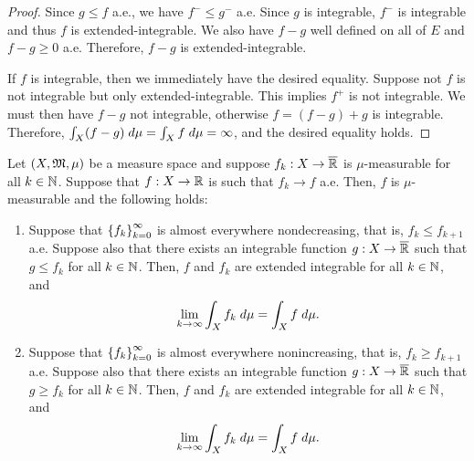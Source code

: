 \documentclass[a4paper]{article}
\begin{document}
\begin{proof}
Since $g \leq f$ a.e., we have $f^- \leq g^-$ a.e. Since 
$g$ is integrable, $f^-$ is integrable and thus $f$ is 
extended-integrable. We also have $f - g$ well defined 
on all of $E$ and $f - g \geq 0$ a.e. Therefore, 
$f - g$ is extended-integrable. 

If $f$ is integrable, then we immediately have the desired 
equality. Suppose not $f$ is not integrable but only 
extended-integrable. This implies $f^+$ is not integrable.
We must then have $f - g$ not integrable, otherwise 
$f = (f - g) + g$ is integrable. Therefore, 
$\int_X (f - g) \; d \mu = \int_X f \; d \mu = \infty$,
and the desired equality holds.
\end{proof}

\begin{thm}
Let $(X, \mathfrak{M}, \mu)$ be a measure space and suppose 
$f_k : X \to \overline{\mathbb{R}}$ is $\mu$-measurable for 
all $k \in \mathbb{N}$. Suppose that 
$f: X \to \mathbb{R}$ is such that $f_k \to f$ a.e. Then, 
$f$ is $\mu$-measurable and the following holds: 
\begin{enumerate}
\item Suppose that $\left\{ f_k \right\}_{k=0}^\infty$ is almost everywhere
nondecreasing, that is, $f_k \leq f_{k+1}$ a.e. Suppose 
also that there exists an integrable function 
$g : X \to \overline{\mathbb{R}}$ such that $g \leq f_k$ for all $k \in \mathbb{N}$.
Then, $f$ and $f_k$ are extended integrable for all $k \in \mathbb{N}$, 
and 
\[
\lim_{k \to \infty} \int_X f_k \; d \mu = \int_X f \; d \mu.
\]

\item Suppose that $\left\{ f_k \right\}_{k=0}^\infty$ is almost everywhere
nonincreasing, that is, $f_k \geq f_{k+1}$ a.e. Suppose 
also that there exists an integrable function 
$g : X \to \overline{\mathbb{R}}$ such that $g \geq f_k$ for all $k \in \mathbb{N}$.
Then, $f$ and $f_k$ are extended integrable for all $k \in \mathbb{N}$, 
and 
\[
\lim_{k \to \infty} \int_X f_k \; d \mu = \int_X f \; d \mu.
\]
\end{enumerate}
\end{thm}
\end{document}
